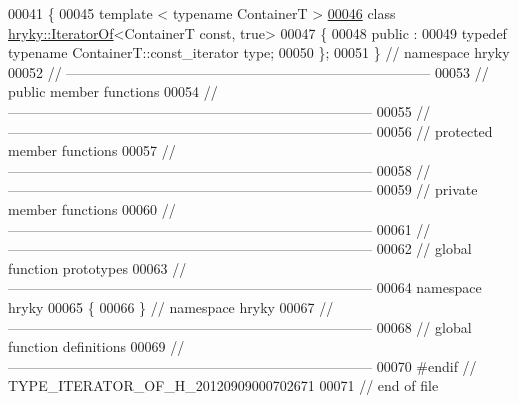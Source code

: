 \begin{DoxyCode}
00041 \{
00045 \textcolor{keyword}{template} < \textcolor{keyword}{typename} ContainerT >
\hypertarget{iterator__of_8h_source_l00046}{}\hyperlink{classhryky_1_1hryky_1_1_iterator_of_3_01_container_t_01const_00_01true_01_4}{00046} \textcolor{keyword}{class }\hyperlink{classhryky_1_1_iterator_of}{hryky::IteratorOf}<ContainerT const, true>
00047 \{
00048 \textcolor{keyword}{public} :
00049     \textcolor{keyword}{typedef} \textcolor{keyword}{typename} ContainerT::const\_iterator type;
00050 \};
00051 \} \textcolor{comment}{// namespace hryky}
00052 \textcolor{comment}{//
      ------------------------------------------------------------------------------}
00053 \textcolor{comment}{// public member functions}
00054 \textcolor{comment}{//
      ------------------------------------------------------------------------------}
00055 \textcolor{comment}{//
      ------------------------------------------------------------------------------}
00056 \textcolor{comment}{// protected member functions}
00057 \textcolor{comment}{//
      ------------------------------------------------------------------------------}
00058 \textcolor{comment}{//
      ------------------------------------------------------------------------------}
00059 \textcolor{comment}{// private member functions}
00060 \textcolor{comment}{//
      ------------------------------------------------------------------------------}
00061 \textcolor{comment}{//
      ------------------------------------------------------------------------------}
00062 \textcolor{comment}{// global function prototypes}
00063 \textcolor{comment}{//
      ------------------------------------------------------------------------------}
00064 \textcolor{keyword}{namespace }hryky
00065 \{
00066 \} \textcolor{comment}{// namespace hryky}
00067 \textcolor{comment}{//
      ------------------------------------------------------------------------------}
00068 \textcolor{comment}{// global function definitions}
00069 \textcolor{comment}{//
      ------------------------------------------------------------------------------}
00070 \textcolor{preprocessor}{#endif // TYPE\_ITERATOR\_OF\_H\_20120909000702671}
00071 \textcolor{preprocessor}{}\textcolor{comment}{// end of file}
\end{DoxyCode}
